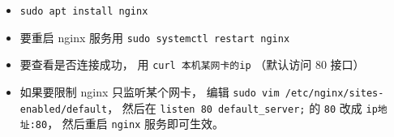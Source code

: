 
\begin{issues}
\issueDraft
\end{issues}

\begin{itemize}
\item \verb|sudo apt install nginx|
\item 要重启 nginx 服务用 \verb|sudo systemctl restart nginx|
\item 要查看是否连接成功， 用 \verb|curl 本机某网卡的ip| （默认访问 80 接口）
\item 如果要限制 nginx 只监听某个网卡， 编辑 \verb|sudo vim /etc/nginx/sites-enabled/default|， 然后在 \verb|listen 80 default_server;| 的 \verb|80| 改成 \verb|ip地址:80|， 然后重启 \verb|nginx| 服务即可生效。
\end{itemize}
